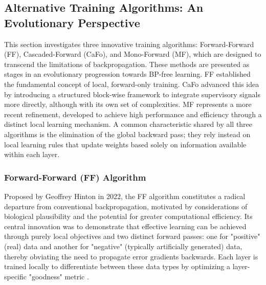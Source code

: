 \subsection{Alternative Training Algorithms: An Evolutionary Perspective}
\label{sec:alternative_algorithms_chap2}

This section investigates three innovative training algorithms: Forward-Forward (FF), Cascaded-Forward (CaFo), and Mono-Forward (MF), which are designed to transcend the limitations of backpropagation. These methods are presented as stages in an evolutionary progression towards BP-free learning. FF established the fundamental concept of local, forward-only training. CaFo advanced this idea by introducing a structured block-wise framework to integrate supervisory signals more directly, although with its own set of complexities. MF represents a more recent refinement, developed to achieve high performance and efficiency through a distinct local learning mechanism. A common characteristic shared by all three algorithms is the elimination of the global backward pass; they rely instead on local learning rules that update weights based solely on information available within each layer.

\subsubsection{Forward-Forward (FF) Algorithm}
\label{subsec:ff_algorithm_chap2}

Proposed by Geoffrey Hinton in 2022, the FF algorithm \cite{hinton2022forward} constitutes a radical departure from conventional backpropagation, motivated by considerations of biological plausibility and the potential for greater computational efficiency. Its central innovation was to demonstrate that effective learning can be achieved through purely local objectives and two distinct forward passes: one for "positive" (real) data and another for "negative" (typically artificially generated) data, thereby obviating the need to propagate error gradients backwards. Each layer is trained locally to differentiate between these data types by optimizing a layer-specific "goodness" metric \cite{hinton2022forward}.

